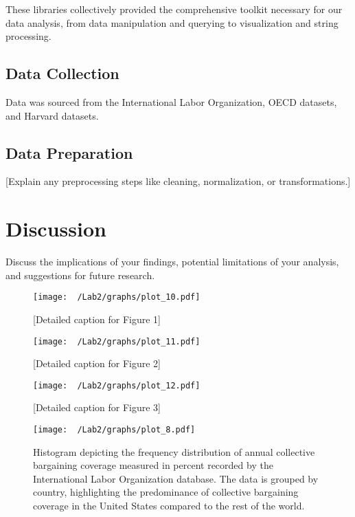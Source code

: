 \documentclass[11pt]{article}\usepackage[]{graphicx}\usepackage[]{xcolor}
\begin{document}
These libraries collectively provided the comprehensive toolkit necessary for our data analysis, from data manipulation and querying to visualization and string processing.

\subsection{Data Collection}
Data was sourced from the International Labor Organization, OECD datasets, and Harvard datasets.

\subsection{Data Preparation}
[Explain any preprocessing steps like cleaning, normalization, or transformations.]

\section{Discussion}
Discuss the implications of your findings, potential limitations of your analysis, and suggestions for future research.




\begin{figure}[h]
\centering
\texttt{[image: ~/Lab2/graphs/plot\_10.pdf]}
\caption{[Detailed caption for Figure 1]}
\label{fig:1.1}
\end{figure}

\begin{figure}[h]
\centering
\texttt{[image: ~/Lab2/graphs/plot\_11.pdf]}
\caption{[Detailed caption for Figure 2]}
\label{fig:1.2}
\end{figure}

\begin{figure}[h]
\centering
\texttt{[image: ~/Lab2/graphs/plot\_12.pdf]}
\caption{[Detailed caption for Figure 3]}
\label{fig:1.3}
\end{figure}

\begin{figure}[h]
\centering
\texttt{[image: ~/Lab2/graphs/plot\_8.pdf]}
\caption{Histogram depicting the frequency distribution of annual collective bargaining coverage measured in percent recorded by the International Labor Organization database. The data is grouped by country, highlighting the predominance of collective bargaining coverage in the United States compared to the rest of the world.}
\label{fig:2.1}
\end{figure}
\end{document}
